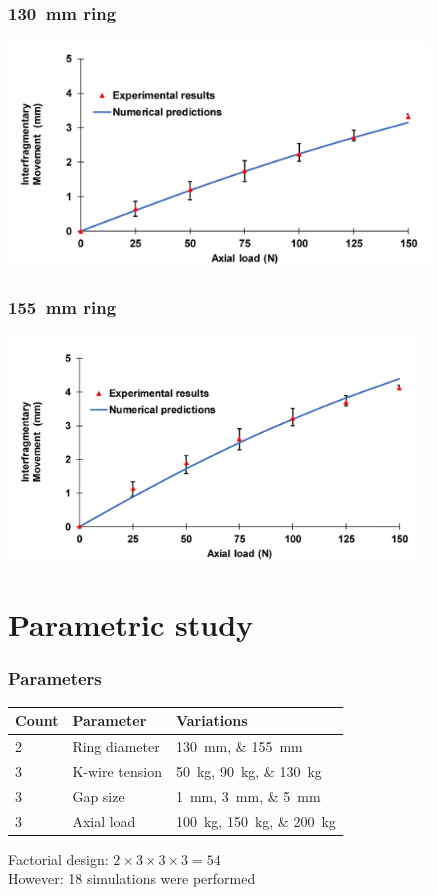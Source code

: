 \documentclass[aspectratio=169,xcolor={svgnames,table},10pt,fleqn]{beamer}
\begin{document}
  \begin{frame}
    \frametitle{\qty{130}{\milli\meter} ring}
    \centering
    \includegraphics[height=6cm]{Figs/130mm_results}
  \end{frame}

  \begin{frame}
    \frametitle{\qty{155}{\milli\meter} ring}
    \centering
    \includegraphics[height=6cm]{Figs/155mm_results}
  \end{frame}

\section{Parametric study}

  \begin{frame}
    \frametitle{Parameters}
    \begin{table}
      \begin{tabular}{lll}
        \toprule
        Count & Parameter & Variations \\
        \midrule
        2 & Ring diameter & \qtylist[list-units = single]{130;155}{\milli\meter} \\
        3 & K-wire tension & \qtylist[list-units = single]{50;90;130}{\kilo\gram} \\
        3 & Gap size & \qtylist[list-units = single]{1;3;5}{\milli\meter} \\
        3 & Axial load & \qtylist[list-units = single]{100;150;200}{\kilo\gram} \\
        \bottomrule
      \end{tabular}
    \end{table}
    \vspace{1cm}
    Factorial design: $2 \times 3 \times 3 \times 3 = 54$\\
    However: \num{18} simulations were performed
  \end{frame}
\end{document}
